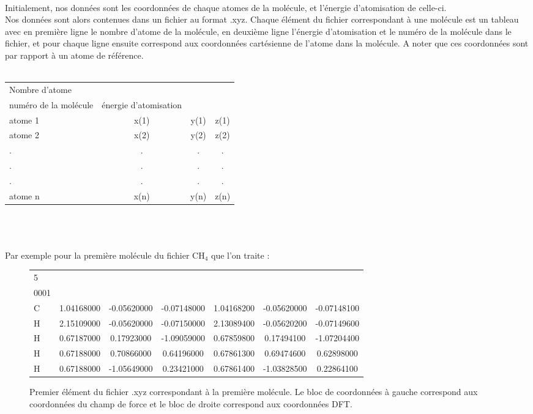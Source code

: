 \documentclass[a4paper,12pt,titlepage]{report}
\begin{document}
\paragraph{}
Initialement, nos données sont les coordonnées de chaque atomes de la molécule, et  l'énergie d'atomisation de celle-ci. \\
Nos données sont alors contenues dans un fichier au format .xyz.
Chaque élément du fichier correspondant à une molécule est un tableau avec en première ligne le nombre d'atome de la molécule, en deuxième ligne l'énergie d'atomisation et le numéro de la molécule dans le fichier, et pour chaque ligne ensuite correspond aux coordonnées cartésienne de l'atome dans la molécule. A noter que ces coordonnées sont par rapport à un atome de référence.\\
\\
\begin{tabular}{ l c c c }
   Nombre d'atome &  & & \quad\\
   numéro de la molécule &\quad énergie d'atomisation &\quad &\\
   atome 1 & x(1) & y(1) & \quad z(1) \\
   atome 2 & x(2) & y(2) & \quad z(2) \\
   . & . & . & \quad . \\
   . & . & . & \quad . \\
   . & . & . & \quad . \\
   atome n & x(n) & y(n) &\quad  z(n) \\
 \end{tabular}
 \\
 \\
 \\
 Par exemple pour la première  molécule du fichier CH$_4$ que l'on traite :
\begin{figure}[!h]
\begin{tabular}{ l c c c c c c}
   5 &  & & \quad\\
   0001 &\quad -417.031 & & & & & \\
   C & 1.04168000 & -0.05620000 & -0.07148000 & 1.04168200 & -0.05620000 & -0.07148100\\
   H  & 2.15109000 & -0.05620000 & -0.07150000 & 2.13089400 & -0.05620200 & -0.07149600\\
   H  & 0.67187000 & 0.17923000 & -1.09059000  &  0.67859800 &  0.17494100 & -1.07204400\\
   H & 0.67188000 & 0.70866000 & 0.64196000 & 0.67861300 &  0.69474600  & 0.62898000\\
   H & 0.67188000 & -1.05649000 & 0.23421000 & 0.67861400 & -1.03828500  &0.22864100\\
 \end{tabular}
 \caption{Premier élément du fichier .xyz correspondant à la première molécule. Le bloc de coordonnées à gauche correspond aux coordonnées du champ de force et le bloc de droite correspond aux coordonnées DFT.}
 \end{figure}
 
\end{document}
